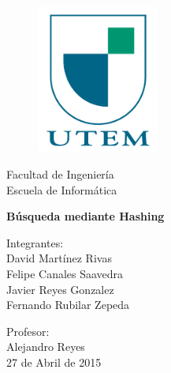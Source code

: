 \documentclass[a4paper,openright,12pt]{report}
\begin{document}
\begin{titlepage}

\begin{center}
\vspace*{-1in}
\begin{figure}[htb]
\begin{center}
\vspace*{0.18in}
\includegraphics[width=4cm]{./.imagen/Logoutem.jpg}
\end{center}
\end{figure}

Facultad de Ingeniería\\
\vspace*{0.12in}
Escuela de Informática \\
\vspace*{0.6in}
\begin{Large}
\textbf{Búsqueda mediante Hashing} \\
\end{Large}
\vspace*{0.3in}
\begin{flushright}
Integrantes:\\
David Martínez Rivas\\
Felipe Canales Saavedra\\
Javier Reyes Gonzalez\\
Fernando Rubilar Zepeda\\
\end{flushright}
\vspace*{0.3in}
\vspace*{0.1in}
\begin{large}
Profesor: \\
Alejandro Reyes \\
\vspace*{0.3in}
27 de Abril de 2015
\end{large}
\end{center}

\end{titlepage}
\end{document}
